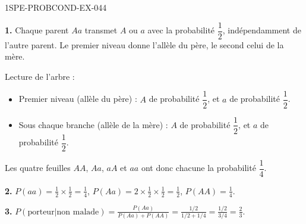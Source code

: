 \begin{corrige}{1SPE-PROBCOND-EX-044}

\textbf{1.} Chaque parent $Aa$ transmet $A$ ou $a$ avec la probabilité $\dfrac{1}{2}$, indépendamment de l'autre parent. Le premier niveau donne l'allèle du père, le second celui de la mère.

\begin{nxarbreproba}
\end{nxarbreproba}

Lecture de l'arbre :

\begin{itemize}
  \item Premier niveau (allèle du père) : $A$ de probabilité $\dfrac{1}{2}$, et $a$ de probabilité $\dfrac{1}{2}$.
  \item Sous chaque branche (allèle de la mère) : $A$ de probabilité $\dfrac{1}{2}$, et $a$ de probabilité $\dfrac{1}{2}$.
\end{itemize}

Les quatre feuilles $AA$, $Aa$, $aA$ et $aa$ ont donc chacune la probabilité $\dfrac{1}{4}$.

\medskip

\textbf{2.} $P(aa) = \frac{1}{2}\times\frac{1}{2} = \frac{1}{4}$, $P(Aa) = 2\times\frac{1}{2}\times\frac{1}{2} = \frac{1}{2}$, $P(AA) = \frac{1}{4}$.

\textbf{3.} $P(\text{porteur}|\text{non malade}) = \frac{P(Aa)}{P(Aa)+P(AA)} = \frac{1/2}{1/2+1/4} = \frac{1/2}{3/4} = \frac{2}{3}$.

\end{corrige}
